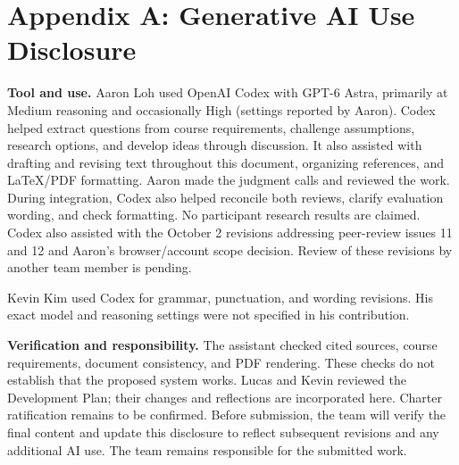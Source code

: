 \documentclass[11pt]{article}
\begin{document}
\clearpage
\section*{Appendix A: Generative AI Use Disclosure}
\textbf{Tool and use.} Aaron Loh used OpenAI Codex with GPT-6 Astra,
primarily at Medium reasoning and occasionally High (settings reported by
Aaron). Codex helped extract questions from course requirements, challenge
assumptions, research options, and develop ideas through discussion. It also
assisted with drafting and revising text throughout this document, organizing
references, and LaTeX/PDF formatting. Aaron made the judgment calls and reviewed
the work. During integration, Codex also helped reconcile both reviews, clarify
evaluation wording, and check formatting. No participant research results are
claimed. Codex also assisted with the October 2 revisions addressing peer-review
issues 11 and 12 and Aaron's browser/account scope decision. Review of these
revisions by another team member is pending.

Kevin Kim used Codex for grammar, punctuation, and wording revisions. His
exact model and reasoning settings were not specified in his contribution.

\textbf{Verification and responsibility.} The assistant checked cited sources,
course requirements, document consistency, and PDF rendering. These checks do
not establish that the proposed system works. Lucas and Kevin reviewed the Development Plan; their changes and reflections
are incorporated here. Charter ratification remains to be confirmed. Before
submission, the team will verify
the final content and update this disclosure to reflect subsequent revisions
and any additional AI use. The team remains responsible for the submitted work.
\end{document}
